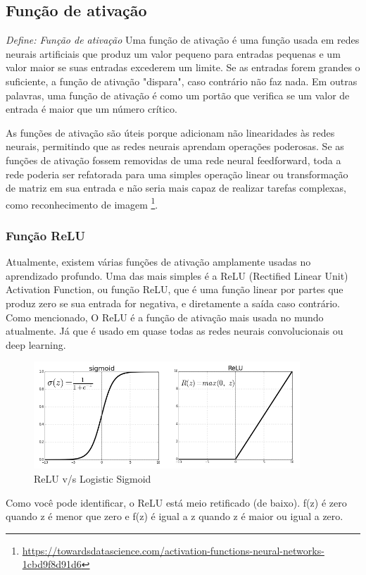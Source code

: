 \subsection[Função de ativação]{Função de ativação}

\textit{Define: Função de ativação} Uma função de ativação é uma função usada em redes neurais artificiais que produz um valor pequeno para entradas pequenas e um valor maior se suas entradas excederem um limite. Se as entradas forem grandes o suficiente, a função de ativação "dispara", caso contrário não faz nada. Em outras palavras, uma função de ativação é como um portão que verifica se um valor de entrada é maior que um número crítico.

As funções de ativação são úteis porque adicionam não linearidades às redes neurais, permitindo que as redes neurais aprendam operações poderosas. Se as funções de ativação fossem removidas de uma rede neural feedforward, toda a rede poderia ser refatorada para uma simples operação linear ou transformação de matriz em sua entrada e não seria mais capaz de realizar tarefas complexas, como reconhecimento de imagem \footnote{\url{https://towardsdatascience.com/activation-functions-neural-networks-1cbd9f8d91d6}}.

\subsubsection[Função ReLU]{Função ReLU}
Atualmente, existem várias funções de ativação amplamente usadas no aprendizado profundo. Uma das mais simples é a ReLU (Rectified Linear Unit) Activation Function, ou função ReLU, que é uma função linear por partes que produz zero se sua entrada for negativa, e diretamente a saída caso contrário.
Como mencionado, O ReLU é a função de ativação mais usada no mundo atualmente. Já que é usado em quase todas as redes neurais convolucionais ou deep learning.

\begin{figure}[H]
   \begin{center}
      \includegraphics[width=10cm]{img/relu.png}
      \caption{ReLU v/s Logistic Sigmoid} \label{relu}
   \end{center}
\end{figure}
Como você pode identificar, o ReLU está meio retificado (de baixo). f(z) é zero quando z é menor que zero e f(z) é igual a z quando z é maior ou igual a zero.

